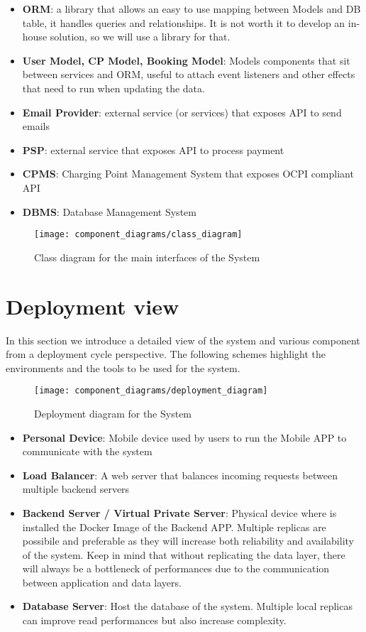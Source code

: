 \begin{itemize}
	\item \textbf{ORM}: a library that allows an easy to use mapping between Models and DB table, it handles queries and relationships. It is not worth it to develop an in-house solution, so we will use a library for that.
	\item \textbf{User Model, CP Model, Booking Model}: Models components that sit between services and ORM, useful to attach event listeners and other effects that need to run when updating the data. 
	\item \textbf{Email Provider}: external service (or services) that exposes API to send emails
	\item \textbf{PSP}: external service that exposes API to process payment
	\item \textbf{CPMS}: Charging Point Management System that exposes OCPI compliant API
	\item \textbf{DBMS}: Database Management System
\end{itemize}

\begin{figure}[h]
\texttt{[image: component\_diagrams/class\_diagram]}
\caption{Class diagram for the main interfaces of the System}
\end{figure}

\clearpage
\newpage

\section{Deployment view}
In this section we introduce a detailed view of the system and various component from a deployment cycle perspective. The following schemes highlight the environments and the tools to be used for the system.


\begin{figure}[h]
\texttt{[image: component\_diagrams/deployment\_diagram]}
\caption{Deployment diagram for the System}
\end{figure}

\begin{itemize}
	\item \textbf{Personal Device}: Mobile device used by users to run the Mobile APP to communicate with the system
	\item \textbf{Load Balancer}: A web server that balances incoming requests between multiple backend servers
	\item \textbf{Backend Server / Virtual Private Server}: Physical device where is installed the Docker Image of the Backend APP. Multiple replicas are possibile and preferable as they will increase both reliability and availability of the system. Keep in mind that without replicating the data layer, there will always be a bottleneck of performances due to the communication between application and data layers.
	\item \textbf{Database Server}: Host the database of the system. Multiple local replicas can improve read performances but also increase complexity.
\end{itemize}

